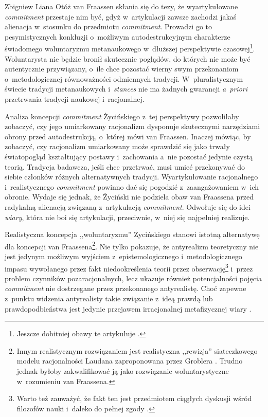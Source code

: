 \begin{artplenv}{Zbigniew Liana}
Otóż van Fraassen
\parencite*[][s.~157n]{van_fraassen_stance_2011} %
 skłania się do tezy, że wyartykułowane \textit{commitment} przestaje nim być, gdyż w~artykulacji zawsze zachodzi jakaś alienacja w~stosunku do przedmiotu \textit{commitment}. Prowadzi go to pesymistycznych konkluzji o~możliwym autodestrukcyjnym charakterze świadomego woluntaryzmu metanaukowego w~dłuższej perspektywie czasowej\footnote{Jeszcze dobitniej obawy te artykułuje 
\parencite[][s.~65]{teller_learning_2011}.%
}. Woluntarysta nie będzie bronił skutecznie poglądów, do których nie może być autentycznie przywiązany, o~ile chce pozostać wierny swym przekonaniom o~metodologicznej równoważności odmiennych tradycji. W~pluralistycznym świecie tradycji metanaukowych i~\textit{stances} nie ma żadnych gwarancji \textit{a~priori} przetrwania tradycji naukowej i~racjonalnej.

Analiza koncepcji \textit{commitment} Życińskiego z~tej perspektywy pozwoliłaby zobaczyć, czy jego umiarkowany racjonalizm dysponuje skutecznymi narzędziami obrony przed autodestrukcją, o~której mówi van Fraassen. Inaczej mówiąc, by zobaczyć, czy racjonalizm umiarkowany może sprawdzić się jako trwały światopogląd kształtujący postawy i~zachowania a~nie pozostać jedynie czystą teorią. Tradycja badawcza, jeśli chce przetrwać, musi umieć przekonywać do siebie członków różnych alternatywnych tradycji. Wyartykułowanie racjonalnego i~realistycznego \textit{commitment} powinno dać się pogodzić z~zaangażowaniem w~ich obronie. Wydaje się jednak, że Życiński nie podziela obaw van Fraassena przed radykalną alienacją związaną z~artykulacją \textit{commitment}. Odwołuje się do idei \textit{wiary}, która nie boi się artykulacji, przeciwnie, w~niej się najpełniej realizuje.

Realistyczna koncepcja ,,woluntaryzmu'' Życińskiego stanowi istotną alternatywę dla koncepcji van Fraassena\footnote{Innym realistycznym rozwiązaniem jest realistyczna ,,rewizja'' siateczkowego modelu racjonalności Laudana zaproponowana przez Groblera
\parencite*[][s.~35nn]{grobler_prawda_1993}. %
 Trudno jednak byłoby zakwalifikować ją jako rozwiązanie woluntarystyczne w~rozumieniu van Fraassena.}. Nie tylko pokazuje, że antyrealizm teoretyczny nie jest jedynym możliwym wyjściem z~epistemologicznego i~metodologicznego impasu wywołanego przez fakt niedookreślenia teorii przez obserwację\footnote{Warto też zauważyć, że fakt ten jest przedmiotem ciągłych dyskusji wśród filozofów nauki i~daleko do pełnej zgody 
\parencite[zob.][]{stanford_underdetermination_2017}.%
} i~przez problem czynników pozaracjonalnych, lecz ukazuje również potencjalności pojęcia \textit{commitment} nie dostrzegane przez przekonanego antyrealistę. Choć zapewne z~punktu widzenia antyrealisty takie związanie z~ideą prawdą lub prawdopodbieństwa jest jedynie przejawem irracjonalnej metafizycznej wiary 
\parencite[][s.~41n]{chakravartty_puzzle_2011}.%



\end{artplenv}
